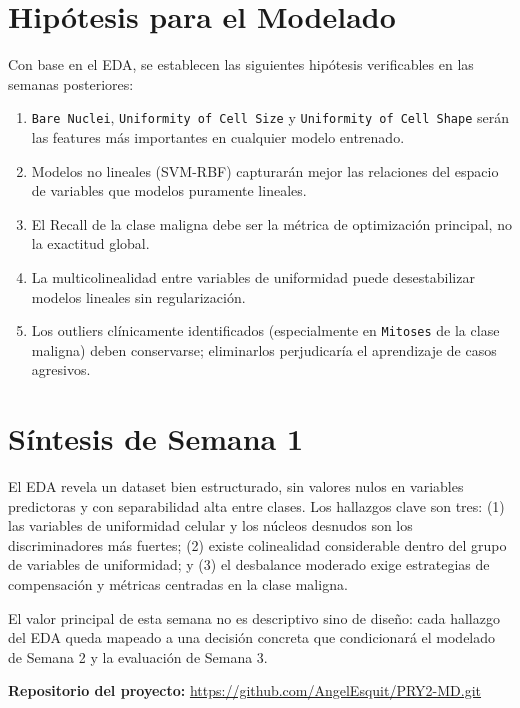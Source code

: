\documentclass[11pt,a4paper]{article}
\begin{document}
\section{Hipótesis para el Modelado}

Con base en el EDA, se establecen las siguientes hipótesis verificables en las semanas posteriores:

\begin{enumerate}[leftmargin=1.4cm, label=\textbf{H\arabic*.}]
\item \texttt{Bare Nuclei}, \texttt{Uniformity of Cell Size} y \texttt{Uniformity of Cell Shape} serán las features más importantes en cualquier modelo entrenado.
\item Modelos no lineales (SVM-RBF) capturarán mejor las relaciones del espacio de variables que modelos puramente lineales.
\item El Recall de la clase maligna debe ser la métrica de optimización principal, no la exactitud global.
\item La multicolinealidad entre variables de uniformidad puede desestabilizar modelos lineales sin regularización.
\item Los outliers clínicamente identificados (especialmente en \texttt{Mitoses} de la clase maligna) deben conservarse; eliminarlos perjudicaría el aprendizaje de casos agresivos.
\end{enumerate}

\section{Síntesis de Semana 1}

El EDA revela un dataset bien estructurado, sin valores nulos en variables predictoras y con separabilidad alta entre clases. Los hallazgos clave son tres: (1) las variables de uniformidad celular y los núcleos desnudos son los discriminadores más fuertes; (2) existe colinealidad considerable dentro del grupo de variables de uniformidad; y (3) el desbalance moderado exige estrategias de compensación y métricas centradas en la clase maligna.

El valor principal de esta semana no es descriptivo sino de diseño: cada hallazgo del EDA queda mapeado a una decisión concreta que condicionará el modelado de Semana 2 y la evaluación de Semana 3.

\vspace{1em}
\noindent\textbf{Repositorio del proyecto:}
\url{https://github.com/AngelEsquit/PRY2-MD.git}
\end{document}
